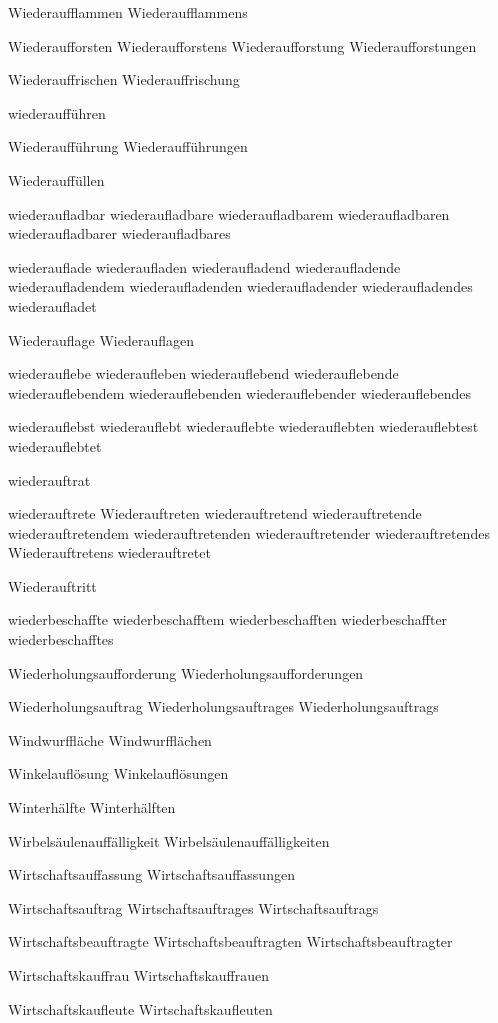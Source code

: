 Wiederaufflammen
Wiederaufflammens

Wiederaufforsten
Wiederaufforstens
Wiederaufforstung
Wiederaufforstungen

Wiederauffrischen
Wiederauffrischung

wiederaufführen

Wiederaufführung
Wiederaufführungen

Wiederauffüllen

wiederaufladbar
wiederaufladbare
wiederaufladbarem
wiederaufladbaren
wiederaufladbarer
wiederaufladbares

wiederauflade
wiederaufladen
wiederaufladend
wiederaufladende
wiederaufladendem
wiederaufladenden
wiederaufladender
wiederaufladendes
wiederaufladet

Wiederauflage
Wiederauflagen

wiederauflebe
wiederaufleben
wiederauflebend
wiederauflebende
wiederauflebendem
wiederauflebenden
wiederauflebender
wiederauflebendes

wiederauflebst
wiederauflebt
wiederauflebte
wiederauflebten
wiederauflebtest
wiederauflebtet

wiederauftrat

wiederauftrete
Wiederauftreten
wiederauftretend
wiederauftretende
wiederauftretendem
wiederauftretenden
wiederauftretender
wiederauftretendes
Wiederauftretens
wiederauftretet

Wiederauftritt

wiederbeschaffte
wiederbeschafftem
wiederbeschafften
wiederbeschaffter
wiederbeschafftes

Wiederholungsaufforderung
Wiederholungsaufforderungen

Wiederholungsauftrag
Wiederholungsauftrages
Wiederholungsauftrags

Windwurffläche
Windwurfflächen

Winkelauflösung
Winkelauflösungen

Winterhälfte
Winterhälften

Wirbelsäulenauffälligkeit
Wirbelsäulenauffälligkeiten

Wirtschaftsauffassung
Wirtschaftsauffassungen

Wirtschaftsauftrag
Wirtschaftsauftrages
Wirtschaftsauftrags

Wirtschaftsbeauftragte
Wirtschaftsbeauftragten
Wirtschaftsbeauftragter

Wirtschaftskauffrau
Wirtschaftskauffrauen

Wirtschaftskaufleute
Wirtschaftskaufleuten


